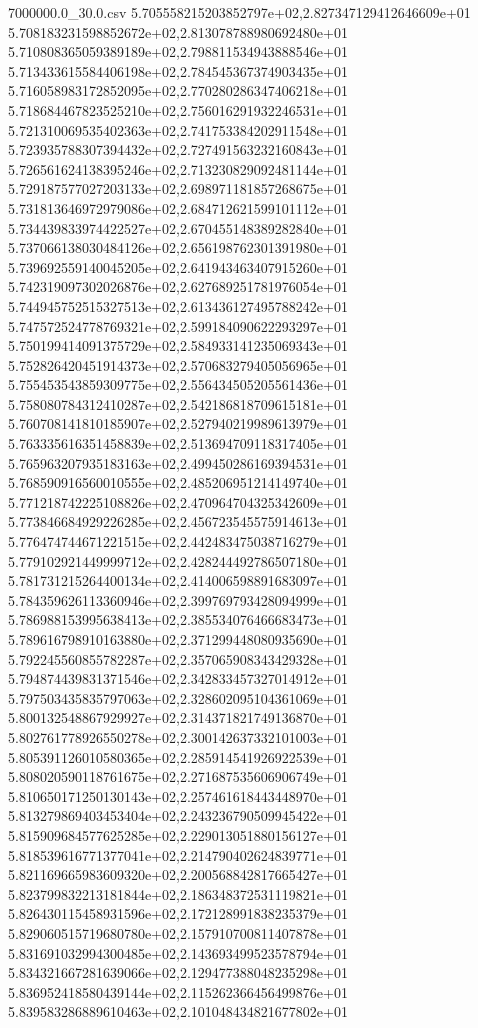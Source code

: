 \begin{filecontents*}{7000000.0_30.0.csv}
5.705558215203852797e+02,2.827347129412646609e+01
5.708183231598852672e+02,2.813078788980692480e+01
5.710808365059389189e+02,2.798811534943888546e+01
5.713433615584406198e+02,2.784545367374903435e+01
5.716058983172852095e+02,2.770280286347406218e+01
5.718684467823525210e+02,2.756016291932246531e+01
5.721310069535402363e+02,2.741753384202911548e+01
5.723935788307394432e+02,2.727491563232160843e+01
5.726561624138395246e+02,2.713230829092481144e+01
5.729187577027203133e+02,2.698971181857268675e+01
5.731813646972979086e+02,2.684712621599101112e+01
5.734439833974422527e+02,2.670455148389282840e+01
5.737066138030484126e+02,2.656198762301391980e+01
5.739692559140045205e+02,2.641943463407915260e+01
5.742319097302026876e+02,2.627689251781976054e+01
5.744945752515327513e+02,2.613436127495788242e+01
5.747572524778769321e+02,2.599184090622293297e+01
5.750199414091375729e+02,2.584933141235069343e+01
5.752826420451914373e+02,2.570683279405056965e+01
5.755453543859309775e+02,2.556434505205561436e+01
5.758080784312410287e+02,2.542186818709615181e+01
5.760708141810185907e+02,2.527940219989613979e+01
5.763335616351458839e+02,2.513694709118317405e+01
5.765963207935183163e+02,2.499450286169394531e+01
5.768590916560010555e+02,2.485206951214149740e+01
5.771218742225108826e+02,2.470964704325342609e+01
5.773846684929226285e+02,2.456723545575914613e+01
5.776474744671221515e+02,2.442483475038716279e+01
5.779102921449999712e+02,2.428244492786507180e+01
5.781731215264400134e+02,2.414006598891683097e+01
5.784359626113360946e+02,2.399769793428094999e+01
5.786988153995638413e+02,2.385534076466683473e+01
5.789616798910163880e+02,2.371299448080935690e+01
5.792245560855782287e+02,2.357065908343429328e+01
5.794874439831371546e+02,2.342833457327014912e+01
5.797503435835797063e+02,2.328602095104361069e+01
5.800132548867929927e+02,2.314371821749136870e+01
5.802761778926550278e+02,2.300142637332101003e+01
5.805391126010580365e+02,2.285914541926922539e+01
5.808020590118761675e+02,2.271687535606906749e+01
5.810650171250130143e+02,2.257461618443448970e+01
5.813279869403453404e+02,2.243236790509945422e+01
5.815909684577625285e+02,2.229013051880156127e+01
5.818539616771377041e+02,2.214790402624839771e+01
5.821169665983609320e+02,2.200568842817665427e+01
5.823799832213181844e+02,2.186348372531119821e+01
5.826430115458931596e+02,2.172128991838235379e+01
5.829060515719680780e+02,2.157910700811407878e+01
5.831691032994300485e+02,2.143693499523578794e+01
5.834321667281639066e+02,2.129477388048235298e+01
5.836952418580439144e+02,2.115262366456499876e+01
5.839583286889610463e+02,2.101048434821677802e+01

\end{filecontents*}

